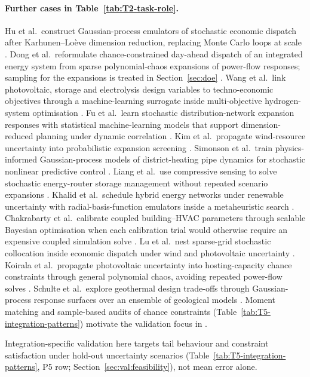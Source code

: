 \paragraph{Further cases in Table~\ref{tab:T2-task-role}.}
Hu et al.\ construct Gaussian-process emulators of stochastic economic
dispatch after Karhunen--Lo\`eve dimension reduction, replacing Monte
Carlo loops at scale \cite{Hu2020,Hu2021671}.
Dong et al.\ reformulate chance-constrained day-ahead dispatch of an
integrated energy system from sparse polynomial-chaos expansions of
power-flow responses; sampling for the expansions is treated in
Section~\ref{sec:doe} \cite{Dong2023}.
Wang et al.\ link photovoltaic, storage and electrolysis design variables
to techno-economic objectives through a machine-learning surrogate inside
multi-objective hydrogen-system optimisation \cite{Wang2024}.
Fu et al.\ learn stochastic distribution-network expansion responses
with statistical machine-learning models that support dimension-reduced
planning under dynamic correlation \cite{Fu20202904}.
Kim et al.\ propagate wind-resource uncertainty into probabilistic
expansion screening \cite{Kim2021}.
Simonson et al.\ train physics-informed Gaussian-process models of
district-heating pipe dynamics for stochastic nonlinear predictive
control \cite{Simonson202036}.
Liang et al.\ use compressive sensing to solve stochastic energy-router
storage management without repeated scenario expansions
\cite{Liang20222192}.
Khalid et al.\ schedule hybrid energy networks under renewable
uncertainty with radial-basis-function emulators inside a metaheuristic
search \cite{Khalid20241959}.
Chakrabarty et al.\ calibrate coupled building--HVAC parameters through
scalable Bayesian optimisation when each calibration trial would
otherwise require an expensive coupled simulation solve
\cite{Chakrabarty2021}.
Lu et al.\ nest sparse-grid stochastic collocation inside economic
dispatch under wind and photovoltaic uncertainty \cite{Lu201991827}.
Koirala et al.\ propagate photovoltaic uncertainty into hosting-capacity
chance constraints through general polynomial chaos, avoiding repeated
power-flow solves \cite{Koirala20242284}.
Schulte et al.\ explore geothermal design trade-offs through Gaussian-process
response surfaces over an ensemble of geological models
\cite{Schulte2020}.
Moment matching and sample-based audits of chance constraints
(Table~\ref{tab:T5-integration-patterns}) motivate the validation focus
in \cite{Muhlpfordt20194806,Safta20172535,Hu2020,Chen2023657}.

Integration-specific validation here targets tail behaviour and
constraint satisfaction under hold-out uncertainty scenarios
(Table~\ref{tab:T5-integration-patterns}, P5 row;
Section~\ref{sec:val:feasibility}), not mean error alone.
